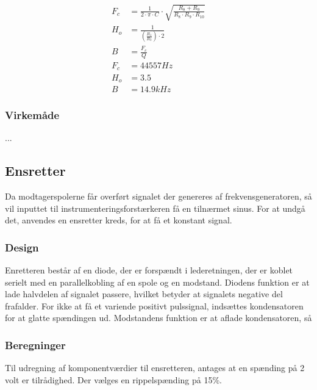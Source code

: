 \begin{align}
F_c & = \frac{1}{2 \cdot \pi \cdot C} \cdot \sqrt{\frac{R_8+R_9}{R_8 \cdot R_9 \cdot R_{10}}} \\
H_o & = \frac{1}{\left( \frac{R_1}{R_3} \right) \cdot 2} \\
B & = \frac{F_c}{Q} \\
F_c & = 44557Hz \\
H_o & = 3.5 \\
B & = 14.9kHz
\end{align}

\subsubsection{Virkemåde}
...

\subsection{Ensretter}
Da modtagerspolerne får overført signalet der genereres af frekvensgeneratoren, så vil inputtet til instrumenteringsforstærkeren få en tilnærmet sinus. 
For at undgå det, anvendes en ensretter kreds, for at få et konstant signal.


\subsubsection{Design}
Enretteren består af en diode, der er forspændt i lederetningen, der er koblet serielt med en parallelkobling af en spole og en modstand. 
Diodens funktion er at lade halvdelen af signalet passere, hvilket betyder at signalets negative del frafalder. 
For ikke at få et variende positivt pulssignal, indsættes kondensatoren for at glatte spændingen ud. Modstandens funktion er at aflade kondensatoren, så



\subsubsection{Beregninger}
Til udregning af komponentværdier til ensretteren, antages at en spænding på 2 volt er tilrådighed. Der vælges en rippelspænding på 15\%. 

